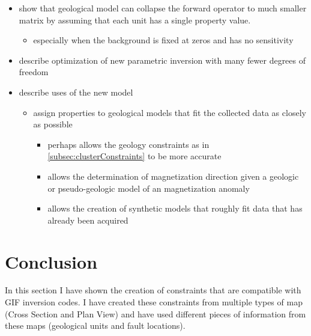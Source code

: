 \begin{itemize}
  \item show that geological model can collapse the forward operator to much smaller matrix by assuming that each unit has a single property value.
 \begin{itemize}
  \item especially when the background is fixed at zeros and has no sensitivity
 \end{itemize}
 \item describe optimization of new parametric inversion with many fewer degrees of freedom
 \item describe uses of the new model
 \begin{itemize}
  \item assign properties to geological models that fit the collected data as closely as possible
  \begin{itemize}
   \item perhaps allows the geology constraints as in \autoref{subsec:clusterConstraints} to be more accurate
   \item allows the determination of magnetization direction given a geologic or pseudo-geologic model of an magnetization anomaly   
   \item allows the creation of synthetic models that roughly fit data that has already been acquired
  \end{itemize}
 \end{itemize}
\end{itemize}



\section{Conclusion}
\label{sec:GIFtoolsConc}

In this section I have shown the creation of constraints that are compatible with \ac{GIF} inversion codes. I have created these constraints from multiple types of map (Cross Section and Plan View) and have used different pieces of information from these maps (geological units and fault locations).



%

\endinput

Any text after an \endinput is ignored.
You could put scraps here or things in progress.
